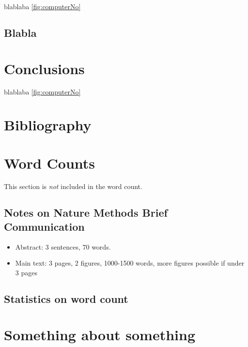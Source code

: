 \documentclass[times, twoside]{zHenriquesLab-StyleBioRxiv}
\begin{document}
blablaba \ref{fig:computerNo}
\blindtext

\subsection*{Blabla}
\blindtext

\section*{Conclusions}

blablaba \ref{fig:computerNo}
\blindtext

\begin{acknowledgements}
    \blindtext
\end{acknowledgements}

\section*{Bibliography}


\onecolumn
\newpage

\section*{Word Counts}
This section is \textit{not} included in the word count.
\subsection*{Notes on Nature Methods Brief Communication}
\begin{itemize}
    \item Abstract: 3 sentences, 70 words.
    \item Main text: 3 pages, 2 figures, 1000-1500 words, more figures possible if under 3 pages
\end{itemize}

\subsection*{Statistics on word count}
\detailtexcount
\newpage

\captionsetup*{format=largeformat}
\section{Something about something} \label{note:Note1}
\Blindtext

\end{document}
